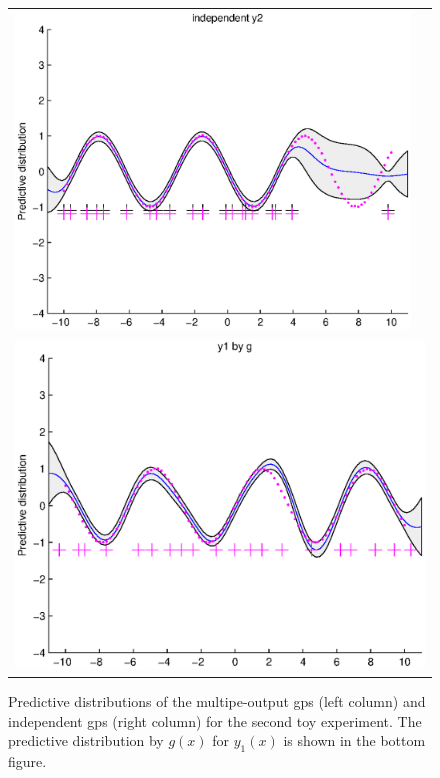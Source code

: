 \documentclass{article} %
\begin{document}
\begin{figure}
\begin{tabular}{cc}
\includegraphics[scale=0.5]{figures/ssvi2-svi2.eps} \\
\multicolumn{2}{c}{\includegraphics[scale=0.5]{figures/ssvi-y1byg.eps} }
\end{tabular}
\label{fig5}
\caption{Predictive distributions of the multipe-output gps (left column) and independent gps (right column) for the second toy experiment. The predictive distribution by $g(x)$ for $y_1(x)$ is shown in the bottom figure.}
\end{figure}
\end{document}
